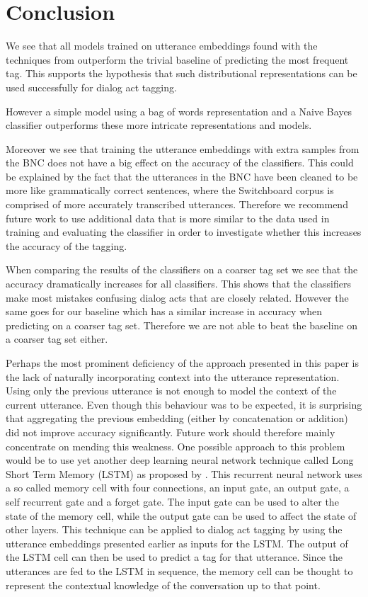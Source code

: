 \section{Conclusion}\label{sec:conclusion}
We see that all models trained on utterance embeddings found with the techniques from  outperform the trivial baseline of predicting the most frequent tag. This supports the hypothesis that such distributional representations can be used successfully for dialog act tagging.

However a simple model using a bag of words representation and a Naive Bayes classifier outperforms these more intricate representations and models. 

Moreover we see that training the utterance embeddings with extra samples from the BNC does not have a big effect on the accuracy of the classifiers. This could be explained by the fact that the utterances in the BNC have been cleaned to be more like grammatically correct sentences, where the Switchboard corpus is comprised of more accurately transcribed utterances. Therefore we recommend future work to use additional data that is more similar to the data used in training and evaluating the classifier in order to investigate whether this increases the accuracy of the tagging.

When comparing the results of the classifiers on a coarser tag set we see that the accuracy dramatically increases for all classifiers. This shows that the classifiers make most mistakes confusing dialog acts that are closely related. However the same goes for our baseline which has a similar increase in accuracy when predicting on a coarser tag set. Therefore we are not able to beat the baseline on a coarser tag set either.

Perhaps the most prominent deficiency of the approach presented in this paper is the lack of naturally incorporating context into the utterance representation. Using only the previous utterance is not enough to model the context of the current utterance. Even though this behaviour was to be expected, it is surprising that aggregating the previous embedding (either by concatenation or addition) did not improve accuracy significantly. Future work should therefore mainly concentrate on mending this weakness. One possible approach to this problem would be to use yet another deep learning neural network technique called Long Short Term Memory (LSTM) as proposed by . This recurrent neural network uses a so called memory cell with four connections, an input gate, an output gate, a self recurrent gate and a forget gate. The input gate can be used to alter the state of the memory cell, while the output gate can be used to affect the state of other layers. This technique can be applied to dialog act tagging by using the utterance embeddings presented earlier as inputs for the LSTM. The output of the LSTM cell can then be used to predict a tag for that utterance. Since the utterances are fed to the LSTM in sequence, the memory cell can be thought to represent the contextual knowledge of the conversation up to that point.

